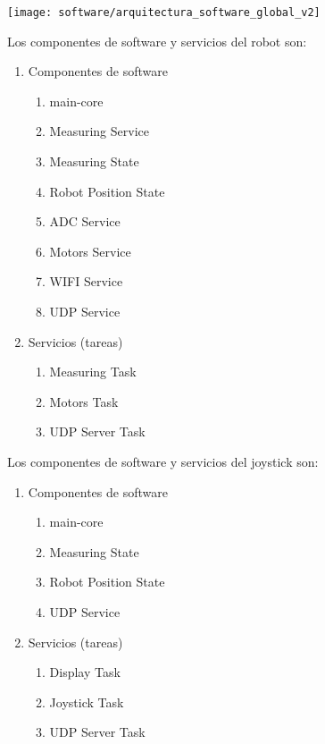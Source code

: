 \begin{center}
  \texttt{[image: software/arquitectura\_software\_global\_v2]}
    \label{fig:arquitectura_software_global}

\end{center}

Los componentes de software y servicios del robot son:

\begin{enumerate}	
	\item Componentes de software
	\begin{enumerate}			
		\item main-core
		\item Measuring Service	
		\item Measuring State
		\item Robot Position State
		\item ADC Service
		\item Motors Service
		\item WIFI Service
		\item UDP Service	
	\end{enumerate}	
	\item Servicios (tareas)
	\begin{enumerate}				
		\item Measuring Task		
		\item Motors Task	
		\item UDP Server Task
	\end{enumerate}			
\end{enumerate}		


Los componentes de software y servicios del joystick son:

\begin{enumerate}	
	\item Componentes de software
	\begin{enumerate}			
		\item main-core
		\item Measuring State
		\item Robot Position State
		\item UDP Service	
	\end{enumerate}	
	\item Servicios (tareas)
	\begin{enumerate}				
		\item Display Task		
		\item Joystick Task	
		\item UDP Server Task
	\end{enumerate}			
\end{enumerate}		

